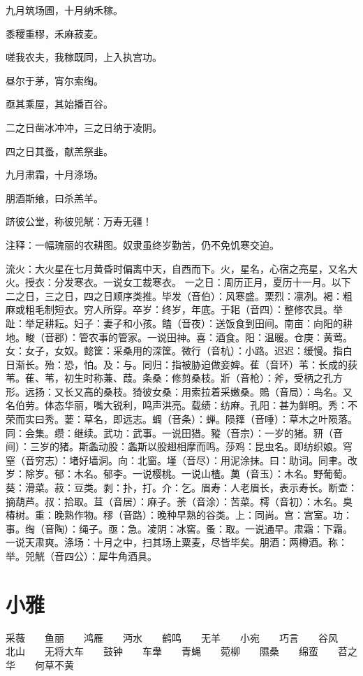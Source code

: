 \documentclass[12pt,UTF8]{ctexbook}
\begin{document}
九月筑场圃，十月纳禾稼。

黍稷重穋，禾麻菽麦。

嗟我农夫，我稼既同，上入执宫功。

昼尔于茅，宵尔索绹。

亟其乘屋，其始播百谷。

二之日凿冰冲冲，三之日纳于凌阴。

四之日其蚤，献羔祭韭。

九月肃霜，十月涤场。

朋酒斯飨，曰杀羔羊。

跻彼公堂，称彼兕觥：万寿无疆！

注释：一幅瑰丽的农耕图。奴隶虽终岁勤苦，仍不免饥寒交迫。

流火：大火星在七月黄昏时偏离中天，自西而下。火，星名，心宿之亮星，又名大火。授衣：分发寒衣。一说女工裁寒衣。 一之日：周历正月，夏历十一月。以下二之日，三之日，四之日顺序类推。毕发（音伯）：风寒盛。栗烈：凛冽。褐：粗麻或粗毛制短衣。穷人所穿。卒岁：终岁，年底。于耜（音四）：整修农具。举趾：举足耕耘。妇子：妻子和小孩。饁（音夜）：送饭食到田间。南亩：向阳的耕地。畯（音郡）：管农事的管家。一说田神。喜：酒食。阳：温暖。仓庚：黄莺。女：女子，女奴。懿筐：采桑用的深筐。微行（音杭）：小路。迟迟：缓慢。指白日渐长。殆：恐，怕。及：与。同归：指被胁迫做妾婢。萑（音环）苇：长成的荻苇。萑、苇，初生时称蒹、葭。条桑：修剪桑枝。斨（音枪）：斧，受柄之孔方形。远扬：又长又高的桑枝。猗彼女桑：用索拉着采嫩桑。鵙（音局）：鸟名。又名伯劳。体态华丽，嘴大锐利，鸣声洪亮。载绩：纺麻。孔阳：甚为鲜明。秀：不荣而实曰秀。葽：草名，即远志。蜩（音条）：蝉。陨箨（音唾）：草木之叶陨落。同：会集。缵：继续。武功：武事。一说田猎。豵（音宗）：一岁的猪。豜（音间）：三岁的猪。斯螽动股：螽斯以股翅相摩而鸣。莎鸡：昆虫名。即纺织娘。穹窒（音穷志）：堵好墙洞。向：北窗。墐（音尽）：用泥涂抹。曰：助词。同聿。改岁：除岁。郁：木名。郁李。一说樱桃。一说山楂。薁（音玉）：木名。野葡萄。葵：滑菜。菽：豆类。剥：扑，打。介：乞。眉寿：人老眉长，表示寿长。断壶：摘葫芦。叔：拾取。苴（音居）：麻子。荼（音涂）：苦菜。樗（音初）：木名。臭椿树。重：晚熟作物。穋（音路）：晚种早熟的谷类。上：同尚。宫：宫室。功：事。绹（音陶）：绳子。亟：急。凌阴：冰窖。蚤：取。一说通早。肃霜：下霜。一说天肃爽。涤场：十月之中，扫其场上粟麦，尽皆毕矣。朋酒：两樽酒。称：举。兕觥（音四公）：犀牛角酒具。

\part{小雅}
采薇　　鱼丽　　鸿雁　　沔水　　鹤鸣　　无羊　　小宛　　巧言　　谷风　　北山　　无将大车　　鼓钟　　车舝　　青蝇　　菀柳　　隰桑　　绵蛮　　苕之华　　何草不黄
\end{document}
